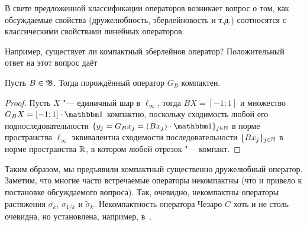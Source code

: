 В свете предложенной классификации операторов возникает вопрос о том,
как обсуждаемые свойства (дружелюбность, эберлейновость и т.д.)
соотносятся с классическими свойствами линейных операторов.

Например, существует ли компактный эберлейнов оператор?
Положительный ответ на этот вопрос даёт

\begin{theorem}
	Пусть $B\in\mathfrak{B}$.
	Тогда порождённый оператор $G_B$ компактен.
\end{theorem}

\begin{proof}
	Пусть $X$ "--- единичный шар в $\ell_\infty$,
	тогда $BX = [-1;1]$
	и множество $G_B X = [-1;1] \cdot \one$
	компактно,
	поскольку сходимость любой его подпоследовательности $\{y_j = G_B x_j = (Bx_j) \cdot \one\}_{j\in\N}$
	в норме пространства $\ell_\infty$ эквивалентна сходимости последовательности
	$\{Bx_j\}_{j\in\mathbb{N}}$ в норме пространства $\mathbb{R}$,
	в котором любой отрезок "--- компакт.
\end{proof}

Таким образом, мы предъявили компактный существенно дружелюбный оператор.
Заметим, что многие часто встречаемые операторы некомпактны
(что и привело к постановке обсуждаемого вопроса).
Так, очевидно, некомпактны операторы растяжения $\sigma_k$, $\sigma_{1/k}$ и $\tilde\sigma_k$.
Некомпактность оператора Чезаро $C$ хоть и не столь очевидна, но установлена, например, в~\cite[Theorem 4.4]{ALALAM20181038}.
